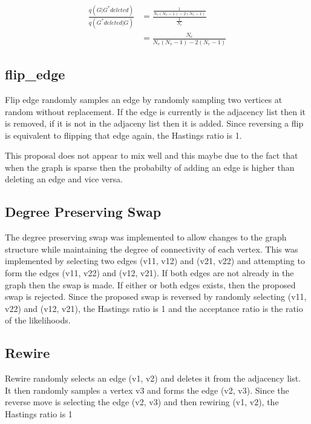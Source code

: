 \documentclass[]{article}
\numberwithin{equation}{section}
\begin{document}
\[ \begin{aligned} \frac{q(G|G^* deleted)}{q(G^* deleted|G)} & = \frac{\frac{1}{N_v(N_v-1) - 2(N_e-1)}}{\frac{1}{N_e}} \\ &= \frac{N_e}{N_v(N_v-1) - 2(N_e-1)} \end{aligned} \]

\hypertarget{flip_edge}{%
\subsection{flip\_edge}\label{flip_edge}}

Flip edge randomly samples an edge by randomly sampling two vertices at
random without replacement. If the edge is currently is the adjacency
list then it is removed, if it is not in the adjaceny list then it is
added. Since reversing a flip is equivalent to flipping that edge again,
the Hastings ratio is 1.

This proposal does not appear to mix well and this maybe due to the fact
that when the graph is sparse then the probabilty of adding an edge is
higher than deleting an edge and vice versa.

\hypertarget{degree-preserving-swap}{%
\subsection{Degree Preserving Swap}\label{degree-preserving-swap}}

The degree preserving swap was implemented to allow changes to the graph
structure while maintaining the degree of connectivity of each vertex.
This was implemented by selecting two edges (v11, v12) and (v21, v22)
and attempting to form the edges (v11, v22) and (v12, v21). If both
edges are not already in the graph then the swap is made. If either or
both edges exists, then the proposed swap is rejected. Since the
proposed swap is reversed by randomly selecting (v11, v22) and (v12,
v21), the Hastings ratio is 1 and the acceptance ratio is the ratio of
the likelihoods.

\hypertarget{rewire}{%
\subsection{Rewire}\label{rewire}}

Rewire randomly selects an edge (v1, v2) and deletes it from the
adjacency list. It then randomly samples a vertex v3 and forms the edge
(v2, v3). Since the reverse move is selecting the edge (v2, v3) and then
rewiring (v1, v2), the Hastings ratio is 1
\end{document}
